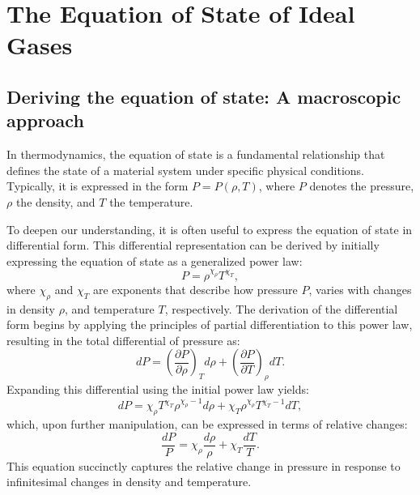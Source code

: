 \documentclass[main.tex]{subfiles}
\begin{document}
\chapter{The Equation of State of Ideal Gases}\label{apx:eos}
    {
        \minitoc
    }
\section{Deriving the equation of state: A macroscopic approach}
In thermodynamics, the equation of state is a fundamental relationship that defines the state of a material system under specific physical conditions. Typically, it is expressed in the form $P=P(\rho,T)$, where $P$ denotes the pressure, $\rho$ the density, and $T$ the temperature. 

To deepen our understanding, it is often useful to express the equation of state in differential form.  This differential representation can be derived by initially expressing the equation of state as a generalized power law:
\begin{equation}
    P = \rho^{\chi_\rho} T^{\chi_T},
\end{equation}
where $\chi_\rho$ and $\chi_T$ are exponents that describe how pressure $P$, varies with changes in density $\rho$, and temperature $T$, respectively. The derivation of the differential form begins by applying the principles of partial differentiation to this power law, resulting in the total differential of pressure as:
\begin{equation*}
    dP = \left( \frac{\partial P}{\partial \rho} \right)_T d\rho + \left( \frac{\partial P}{\partial T} \right)_\rho dT.
\end{equation*}
Expanding this differential using the initial power law yields:
\begin{equation*}
    dP = \chi_\rho T^{\chi_T} \rho^{\chi_\rho - 1} d\rho +  \chi_T \rho^{\chi_\rho} T^{\chi_T - 1} dT,
\end{equation*}
which, upon further manipulation, can be expressed in terms of relative changes:
\begin{equation}
    \frac{dP}{P} = \chi_\rho \frac{d\rho}{\rho} + \chi_T \frac{dT}{T}.
\end{equation}
This equation succinctly captures the relative change in pressure in response to infinitesimal changes in density and temperature. 
\end{document}
